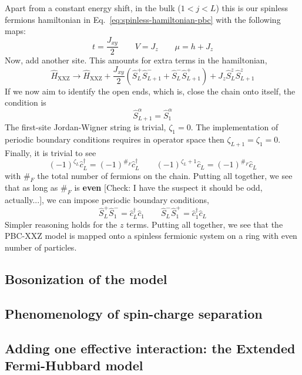 Apart from a constant energy shift, in the bulk ($1<j<L$) this is our spinless fermions hamiltonian in Eq.~\eqref{eq:spinless-hamiltonian-pbc} with the following maps:
\[
	t = \frac{J_{xy}}{2}
	\qquad
	V = J_z
	\qquad
	\mu = h + J_z
\]
Now, add another site. This amounts for extra terms in the hamiltonian,
\[
	\hat H_\mathrm{XXZ} \to \hat H_\mathrm{XXZ} + \frac{J_{xy}}{2} \left( 
		\hat S_L^+ \hat S_{L+1}^- + \hat S_L^- \hat S_{L+1}^+
	\right) + J_z \hat S_L^z \hat S_{L+1}^z
\]
If we now aim to identify the open ends, which is, close the chain onto itself, the condition is
\[
	\hat S_{L+1}^\alpha = \hat S_1^\alpha
\]
The first-site Jordan-Wigner string is trivial, $\zeta_1 = 0$. The implementation of periodic boundary conditions requires in operator space then $\zeta_{L+1} = \zeta_1 = 0$. Finally, it is trivial to see
\[
	(-1)^{\zeta_L} \hat c_L^\dagger = (-1)^{\#_F} \hat c_L^\dagger
	\qquad
	(-1)^{\zeta_L+1} \hat c_L = (-1)^{\#_F} \hat c_L
\]
with $\#_F$ the total number of fermions on the chain. Putting all together, we see that as long as $\#_F$ is \textbf{even} {\color{tabred}[Check: I have the suspect it should be odd, actually...]}, we can impose periodic boundary conditions,
\[
	\hat S_L^+ \hat S_1^- = \hat c_L^\dagger \hat c_1
	\qquad
	\hat S_L^- \hat S_1^+ = \hat c_1^\dagger \hat c_L
\]
Simpler reasoning holds for the $z$ terms. Putting all together, we see that the PBC-$\mathrm{XXZ}$ model is mapped onto a spinless fermionic system on a ring with even number of particles.

\todo

\subsection{Bosonization of the model}

\todo

\subsection{Phenomenology of spin-charge separation}

\todo

\subsection{Adding one effective interaction: the Extended Fermi-Hubbard model}

\todo